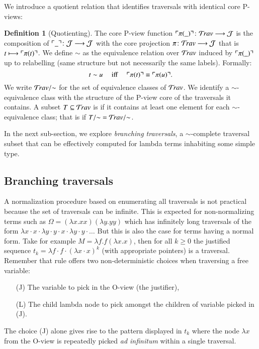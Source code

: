 \documentclass{elsarticle}
\theoremstyle{plain}
\theoremstyle{definition}
\newtheorem{definition}{Definition}[section]
\theoremstyle{remark}
\newcommand{\travulc}{\travset}
\def\coresymbol{\pi} %
\newcommand{\core}[1]{\coresymbol(#1)} %
\def\justseqset{\mathcal{J}}
\begin{document}
We introduce a quotient relation that identifies traversals with identical core P-views:
\begin{definition}[Quotienting]
The core P-view function
$\pview{\core{\_}} \colon \travulc \longrightarrow \justseqset $
is the composition of $\pview{\_}\colon \justseqset \longrightarrow \justseqset$ with the core projection $\coresymbol\colon\travulc  \longrightarrow \justseqset$ that is $t \longmapsto \pview{\core{t}}$.
We define $\sim$ as the equivalence relation over $\travulc$ induced by $\pview{\core{\_}}$ up to relabelling (same structure but not necessarily the same labels). Formally:
$$t \sim u \quad \mbox{ iff } \quad  \pview{\core{t}} \equiv \pview{\core{u}} .$$
We write $\travulc/{\sim}$ for the set of equivalence classes of $\travulc$. We identify a $\sim$-equivalence class with the structure of the P-view core of the traversals it contains. A subset $T\subseteq \travulc$ is  if it contains at least one element for each $\sim$-equivalence class; that is if $T/{\sim} = \travulc/{\sim}$.
\end{definition}

In the next sub-section, we explore
\emph{branching traversals}, a $\sim$-complete traversal subset that can be effectively computed for lambda terms inhabiting some simple type.

\subsection{Branching traversals}

A normalization procedure based on enumerating all traversals is not practical because the set of traversals can be infinite. This is expected for non-normalizing terms such as $\Omega = (\lambda x. x x)(\lambda y. y y)$ which has infinitely long traversals of the form $\lambda x \cdot x \cdot \lambda y \cdot y \cdot x \cdot \lambda y \cdot y \cdot \ldots$ But this is also the case for terms having a normal form. Take for example $M = \lambda f . f (\lambda x. x)$, then for all $k\geq0$ the justified sequence $t_k = \lambda f \cdot f \cdot (\lambda x \cdot  x)^k$ (with appropriate pointers) is a traversal.
Remember that rule  offers two non-deterministic choices when traversing a free variable:
\begin{itemize}
\item[(J)] The variable to pick in the O-view (the justifier),
\item[(L)] The child lambda node to pick amongst the children of variable picked in (J).
\end{itemize}
The choice (J) alone gives rise to the pattern displayed in $t_k$ where the node $\lambda x$ from the O-view is repeatedly picked {\it ad infinitum} within a single traversal.
\end{document}
